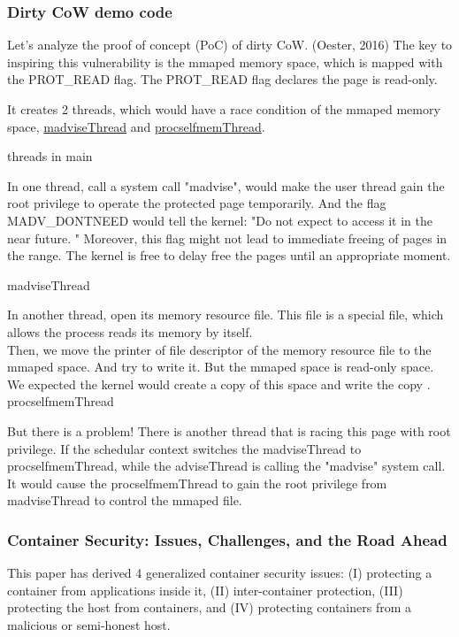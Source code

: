 \documentclass[12pt,a4paper]{article}
\begin{document}
\subsubsection{Dirty CoW demo code}
Let's analyze the proof of concept (PoC) of dirty CoW. (Oester, 2016) \cite{Dirty_CoW}
The key to inspiring this vulnerability is the mmaped memory space, which is mapped with
the PROT\_READ flag. The PROT\_READ flag declares the page is read-only.


It creates 2 threads, which would have a race condition of the mmaped memory space,
\hyperlink{madvise}{madviseThread} and \hyperlink{procself}{procselfmemThread}.

\hypertarget{threads_main}{threads in main}


In one thread, call a system call "madvise", would make the user thread gain the root
privilege to operate the protected page temporarily. And the flag MADV\_DONTNEED would
tell the kernel: "Do not expect to access it in the near future. \cite{Madvise}" Moreover,
this flag might not lead to immediate freeing of pages in the range. The kernel is free
to delay free the pages until an appropriate moment. \cite{Madvise}

\hypertarget{madvise}{madviseThread}


In another thread, open its memory resource file. This file is a special file, which allows
the process reads its memory by itself.\\
Then, we move the printer of file descriptor of the memory resource file to the mmaped
space. And try to write it. But the mmaped space is read-only space. We expected the
kernel would create a copy of this space and write the copy \cite{root_exploit}.\\
\hypertarget{procself}{procselfmemThread}


But there is a problem! There is another thread that is racing this page with root privilege.
If the schedular context switches the madviseThread to procselfmemThread, while the
adviseThread is calling the "madvise" system call. It would cause the procselfmemThread
to gain the root privilege from madviseThread to control the mmaped file.

\subsubsection{Container Security: Issues, Challenges, and the Road Ahead}
This paper \cite{Road_Ahead} has derived 4 generalized container security issues:
(\RN{1}) protecting a container from applications inside it, (\RN{2}) inter-container
protection, (\RN{3}) protecting the host from containers, and (\RN{4}) protecting containers
from a malicious or semi-honest host. \cite{Road_Ahead}
\end{document}
